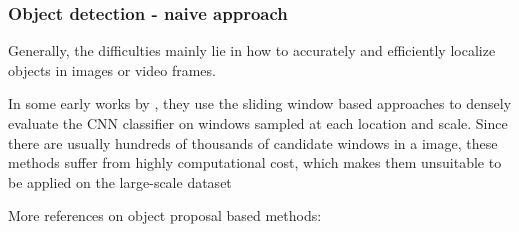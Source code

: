 \begin{frame}
	\frametitle{Object detection - naive approach}


	Generally, the difficulties mainly lie in how to accurately and efficiently localize objects in images or video frames.

	\bigskip

	In some early works by \cite{vaillant1994original, nowlan1995convolutional, girshick2015deformable}, they use the sliding window based approaches to densely evaluate the CNN classifier on windows sampled at each location and scale. Since there are usually hundreds of thousands of candidate windows in a image, these methods suffer from highly computational cost, which makes them unsuitable to be applied on the large-scale dataset

	\bigskip

	More references on object proposal based methods:

\smallskip




\end{frame}

